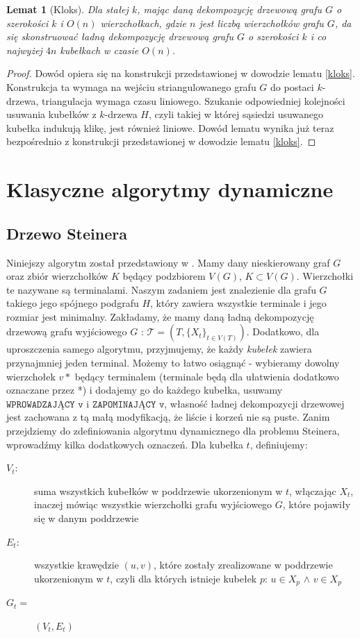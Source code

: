 \documentclass[12pt, oneside]{report}
\newtheorem{lemma}{Lemat}
\newcommand\Omicron{O}
\begin{document}
\begin{lemma}[Kloks]
Dla stałej $k$, mając daną dekompozycję drzewową grafu $G$ o szerokości $k$ i $\Omicron(n)$ wierzchołkach, gdzie $n$ jest liczbą wierzchołków grafu $G$, da się skonstruować ładną dekompozycję drzewową grafu $G$ o szerokości $k$ i co najwyżej $4n$ kubełkach w czasie $\Omicron(n)$. 
\end{lemma}

\begin{proof}
Dowód opiera się na konstrukcji przedstawionej w dowodzie lematu \ref{kloks}. Konstrukcja ta wymaga na wejściu striangulowanego grafu $G$ do postaci $k$-drzewa, triangulacja wymaga czasu liniowego. Szukanie odpowiedniej kolejności usuwania kubełków z $k$-drzewa $H$, czyli takiej w której sąsiedzi usuwanego kubełka indukują klikę, jest również liniowe. Dowód lematu wynika już teraz bezpośrednio z konstrukcji przedstawionej w dowodzie lematu \ref{kloks}.
\end{proof}

\newpage
  	\chapter{Klasyczne algorytmy dynamiczne}
    	\section{Drzewo Steinera}

Niniejszy algorytm został przedstawiony w \cite{parametrized_algorithms}. Mamy dany nieskierowany graf $G$ oraz zbiór wierzchołków $K$ będący podzbiorem $V(G)$, $K \subset V(G)$. Wierzchołki te nazywane są terminalami.
Naszym zadaniem jest znalezienie dla grafu $G$ takiego jego spójnego podgrafu $H$, który zawiera wszystkie terminale i jego rozmiar jest minimalny.
Zakładamy, że mamy daną ładną dekompozycję drzewową grafu wyjściowego $G$ : $\mathcal{T} = (T, \{X_t\}_{t \in V(T)})$. Dodatkowo, dla uproszczenia samego algorytmu, przyjmujemy, że każdy \emph{kubełek} zawiera przynajmniej jeden terminal. Możemy to łatwo osiągnąć - wybieramy dowolny wierzchołek ${v*}$ będący terminalem (terminale będą dla ułatwienia dodatkowo oznaczane przez *) i dodajemy go do każdego kubełka, usuwamy $\texttt{WPROWADZAJĄCY v}$ i $\texttt{ZAPOMINAJĄCY v}$, własność ładnej dekompozycji drzewowej jest zachowana z tą małą modyfikacją, że liście i korzeń nie są puste.
\newline
Zanim przejdziemy do zdefiniowania algorytmu dynamicznego dla problemu Steinera, wprowadźmy kilka dodatkowych oznaczeń.
Dla kubełka $t$, definiujemy:
\begin{description}
\item[$V_t:$]{suma wszystkich kubełków w poddrzewie ukorzenionym w $t$, włączając $X_t$, inaczej mówiąc wszystkie wierzchołki grafu wyjściowego $G$, które pojawiły się w danym poddrzewie}
\item[$E_t:$]{wszystkie krawędzie $(u, v)$, które zostały zrealizowane w poddrzewie ukorzenionym w $t$, czyli dla których istnieje kubełek $p$: $u \in X_p$ $\wedge$ $v \in X_p$} 
\item[$G_t = $]{$(V_t, E_t)$}
\end{description}
\end{document}
